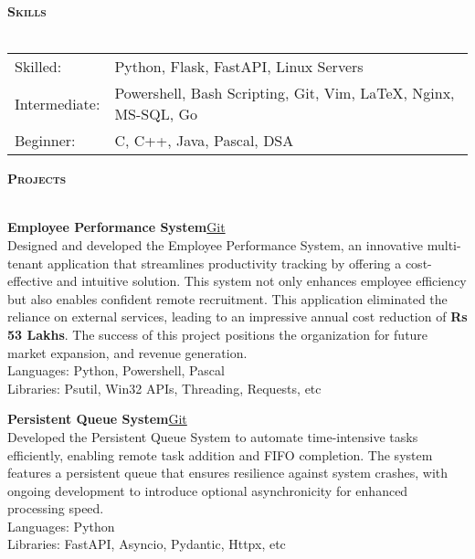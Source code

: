 \documentclass[a4paper]{article}
\newcommand{\lineunder} {
\vspace*{-8pt} \\
\hspace*{-18pt} \hrulefill \\
}
\newcommand{\header}[1]{%
{\hspace*{-18pt}\vspace*{6pt} \textsc{\textbf{\Large{#1}}}}%
\vspace*{-6pt} \lineunder
}
\begin{document}

\header{Skills}
\vspace{1mm}

\begin{tabular}{V{5cm} @{\hskip 0.6cm} V{12cm}}
Skilled: & Python, Flask, FastAPI, Linux Servers \\
Intermediate: & Powershell, Bash Scripting, Git, Vim, \LaTeX, Nginx, MS-SQL, Go \\
Beginner: & C, C++, Java, Pascal, DSA \\
\end{tabular}

\vspace{4mm}


\header{Projects}
\vspace{1mm}

{\textbf{Employee Performance System}}\hfill \href{https://github.com/swarnimcodes/employee-performance}{Git}\\
Designed and developed the Employee Performance System, an innovative multi-tenant application that 
streamlines productivity tracking by offering a cost-effective and intuitive solution. 
This system not only enhances employee efficiency but also enables confident 
remote recruitment. This application eliminated the reliance on external services, 
leading to an impressive annual cost reduction of \textbf{Rs 53 Lakhs}. 
The success of this project positions the organization for future market expansion,
and revenue generation. \\
Languages: Python, Powershell, Pascal \\
Libraries: Psutil, Win32 APIs, Threading, Requests, etc \\
\vspace*{2mm}

{\textbf{Persistent Queue System}}\hfill \href{https://github.com/swarnimcodes/kafkaesqueue}{Git}\\
Developed the Persistent Queue System to automate time-intensive tasks efficiently, 
enabling remote task addition and FIFO completion. The system features a persistent 
queue that ensures resilience against system crashes, with ongoing development to 
introduce optional asynchronicity for enhanced processing speed. \\
Languages: Python \\
Libraries: FastAPI, Asyncio, Pydantic, Httpx, etc \\
\vspace*{2mm}
\end{document}
